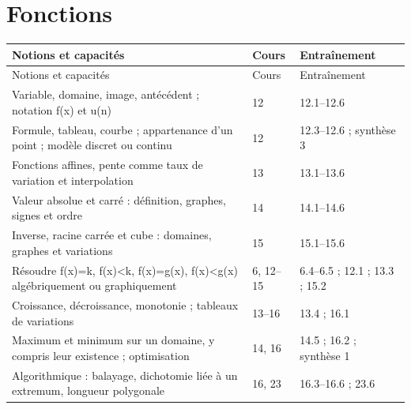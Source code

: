 \documentclass[11pt,a4paper,oneside]{book}
\begin{document}
\section{Fonctions}
\small
\begin{longtable}{p{}p{}p{}}
\toprule Notions et capacités & Cours & Entraînement\\\midrule
\endfirsthead\toprule Notions et capacités & Cours & Entraînement\\\midrule\endhead
Variable, domaine, image, antécédent ; notation f(x) et u(n) & 12 & 12.1--12.6\\
Formule, tableau, courbe ; appartenance d'un point ; modèle discret ou continu & 12 & 12.3--12.6 ; synthèse 3\\
Fonctions affines, pente comme taux de variation et interpolation & 13 & 13.1--13.6\\
Valeur absolue et carré : définition, graphes, signes et ordre & 14 & 14.1--14.6\\
Inverse, racine carrée et cube : domaines, graphes et variations & 15 & 15.1--15.6\\
Résoudre f(x)=k, f(x)<k, f(x)=g(x), f(x)<g(x) algébriquement ou graphiquement & 6, 12--15 & 6.4--6.5 ; 12.1 ; 13.3 ; 15.2\\
Croissance, décroissance, monotonie ; tableaux de variations & 13--16 & 13.4 ; 16.1\\
Maximum et minimum sur un domaine, y compris leur existence ; optimisation & 14, 16 & 14.5 ; 16.2 ; synthèse 1\\
Algorithmique : balayage, dichotomie liée à un extremum, longueur polygonale & 16, 23 & 16.3--16.6 ; 23.6\\
\bottomrule\end{longtable}
\normalsize
\end{document}
